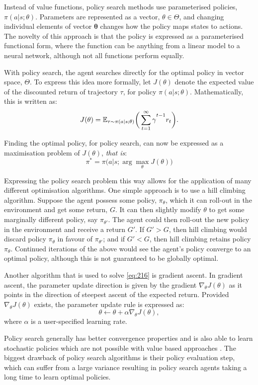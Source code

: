 Instead of value functions, policy search methods use parameterised policies, $\pi(a | s;\theta)$. Parameters are represented as a vector, $\theta \in \Theta$, and changing individual elements of vector $\mathbf{\theta}$ changes how the policy maps states to actions. The novelty of this approach is that the policy is expressed as a parameterised functional form, where the function can be anything from a linear model to a neural network, although not all functions perform equally.

With policy search, the agent searches directly for the optimal policy in vector space, $\Theta$. To express this idea more formally, let $J(\theta)$ denote the expected value of the discounted return of trajectory $\tau$, for policy $\pi(a|s;\theta)$. Mathematically, this is written as:
\begin{equation}
	J(\theta) = \mathbb{E}_{\tau \sim \pi(a|s;\theta)} \bigg( \sum_{t=1}^{\infty} \gamma\mystrut^{t-1} r_t \bigg). \label{eq:215}
\end{equation}

Finding the optimal policy, for policy search, can now be expressed as a maximisation problem of $J(\theta)$, \textit{that is}:
\begin{equation}
	\pi^* = \pi\big(a|s;\arg\max_{\theta} J(\theta)\big) \label{eq:216}
\end{equation}

Expressing the policy search problem this way allows for the application of many different optimisation algorithms. One simple approach is to use a hill climbing algorithm. Suppose the agent possess some policy, $\pi_{\theta}$, which it can roll-out in the environment and get some return, $G$. It can then slightly modify $\theta$ to get some marginally different policy, say $\pi_{\theta'}$. The agent could then roll-out the new policy in the environment and receive a return $G'$. If $G' > G$, then hill climbing would discard policy $\pi_{\theta}$ in favour of $\pi_{\theta'}$; and if $G' < G$, then hill climbing retains policy $\pi_{\theta}$. Continued iterations of the above would see the agent's policy converge to an optimal policy, although this is not guaranteed to be globally optimal.

Another algorithm that is used to solve \ref{eq:216} is gradient ascent. In gradient ascent, the parameter update direction is given by the gradient $\nabla_{\theta} J(\theta)$ as it points in the direction of steepest ascent of the expected return. Provided $\nabla_{\theta} J(\theta)$ exists, the parameter update rule is expressed as:
\begin{equation}
	\theta \gets \theta + \alpha \nabla_{\theta}J(\theta),
\end{equation}
where $\alpha$ is a user-specified learning rate.

Policy search generally has better convergence properties and is also able to learn stochastic policies which are not possible with value based approaches \cite{Silver2015}. The biggest drawback of policy search algorithms is their policy evaluation step, which can suffer from a large variance resulting in policy search agents taking a long time to learn optimal policies. 
